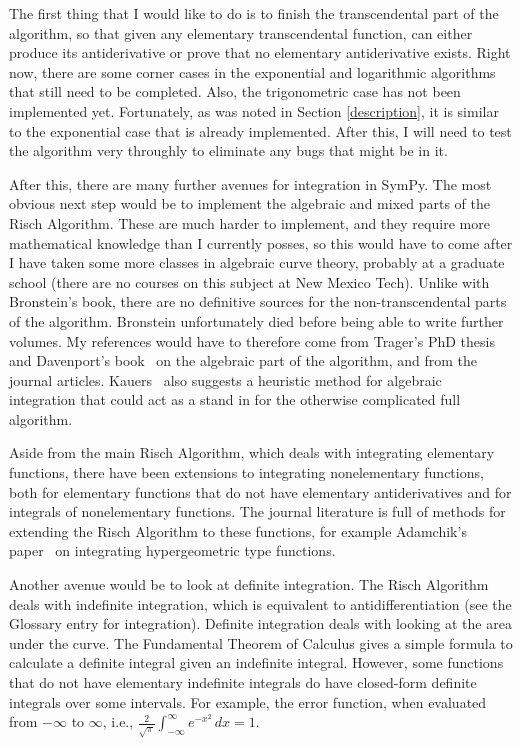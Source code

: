 The first thing that I would like to do is to finish the
\gls{transcendental} part of the algorithm, so that given any
\gls{elementary} \gls{transcendental} function, \rischintegrate{} can
either produce its antiderivative or prove that no \gls{elementary}
antiderivative exists.  Right now, there are some corner cases in the
exponential and logarithmic algorithms that still need to be completed. 
Also, the trigonometric case has not been implemented yet.  Fortunately,
as was noted in Section \ref{description}, it is similar to the
exponential case that is already implemented.  After this, I will need
to test the algorithm very throughly to eliminate any bugs that might be
in it.

After this, there are many further avenues for \gls{integration} in
SymPy.  The most obvious next step would be to implement the algebraic
and mixed parts of the Risch Algorithm.  These are much harder to
implement, and they require more mathematical knowledge than I currently
posses, so this would have to come after I have taken some more classes
in algebraic curve theory, probably at a graduate school (there are no
courses on this subject at New Mexico Tech).  Unlike with Bronstein's
book, there are no definitive sources for the non-\gls{transcendental}
parts of the algorithm.  Bronstein unfortunately died before being able
to write further volumes.  My references would have to therefore come
from Trager's PhD thesis~\cite{trager1984integration} and Davenport's
book~\cite{davenport1984integration} on the algebraic part of the
algorithm, and from the journal articles.  Kauers~\cite{kauers2008integration} also suggests a heuristic method for
\gls{algebraic} \gls{integration} that could act as a stand in for the
otherwise complicated full algorithm.

Aside from the main Risch Algorithm, which deals with integrating
\gls{elementary} functions, there have been extensions to integrating
nonelementary functions, both for \gls{elementary} functions that do not
have \gls{elementary} antiderivatives and for integrals of nonelementary
functions.  The journal literature is full of methods for extending the
Risch Algorithm to these functions, for example Adamchik's paper~\cite{adamchik1990hypergeometric} on integrating hypergeometric type
functions.

Another avenue would be to look at definite \gls{integration}.  The
Risch Algorithm deals with indefinite \gls{integration}, which is
equivalent to antidifferentiation (see the Glossary entry for
\gls{integration}).  Definite \gls{integration} deals with looking at
the area under the curve.  The Fundamental Theorem of Calculus gives a
simple formula to calculate a definite integral given an indefinite
integral.  However, some functions that do not have \gls{elementary}
indefinite integrals do have closed-form definite integrals over some
intervals.  For example, the \gls{error function}, when evaluated from
$-\infty$ to $\infty$, i.e.,
$\frac{2}{\sqrt{\pi}}\int_{-\infty}^\infty{e^{-x^2}\,dx}=1$.

